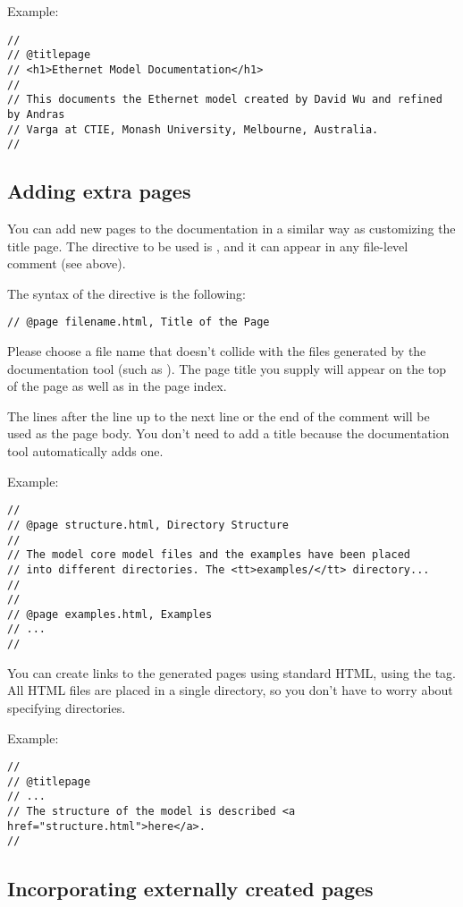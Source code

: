 Example:

\begin{verbatim}
//
// @titlepage
// <h1>Ethernet Model Documentation</h1>
//
// This documents the Ethernet model created by David Wu and refined by Andras
// Varga at CTIE, Monash University, Melbourne, Australia.
//
\end{verbatim}


\subsection{Adding extra pages}

You can add new pages to the documentation in a similar way as customizing
the title page. The directive to be used is , and it can
appear in any file-level comment (see above).

The syntax of the  directive is the following:

\begin{verbatim}
// @page filename.html, Title of the Page
\end{verbatim}

Please choose a file name that doesn't collide with the files generated
by the documentation tool (such as ).
The page title you supply will appear on the top of the page as well as
in the page index.

The lines after the  line up to the next  line
or the end of the comment will be used as the page body.
You don't need to add a title because the documentation tool
automatically adds one.

Example:
\begin{verbatim}
//
// @page structure.html, Directory Structure
//
// The model core model files and the examples have been placed
// into different directories. The <tt>examples/</tt> directory...
//
//
// @page examples.html, Examples
// ...
//
\end{verbatim}

You can create links to the generated pages using standard HTML,
using the  tag. All HTML files are
placed in a single directory, so you don't have to worry about
specifying directories.

Example:
\begin{verbatim}
//
// @titlepage
// ...
// The structure of the model is described <a href="structure.html">here</a>.
//
\end{verbatim}


\subsection{Incorporating externally created pages}

